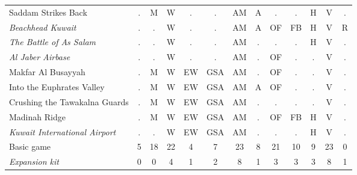 \documentclass[a4paper]{article}
\newenvironment{texte}{\rmfamily\footnotesize}{}
\begin{document}
\begin{texte}
\begin{tabular}{lcccccccccccc}
     Saddam Strikes Back                           & . &  M &  W &  . &  .  & AM & A &  . &  . & H &  V & . \\
\it  Beachhead Kuwait                              & . &  . &  W &  . &  .  & AM & A & OF & FB & H &  V & R \\
\it  The Battle of As Salam                        & . &  . &  W &  . &  .  & AM & . &  . &  . & H &  V & . \\
\it  Al Jaber Airbase                              & . &  . &  W &  . &  .  & AM & . & OF &  . & . &  V & . \\
     Makfar Al Busayyah                            & . &  M &  W & EW & GSA & AM & . & OF &  . & . &  V & . \\
     Into the Euphrates Valley                     & . &  M &  W & EW & GSA & AM & A & OF &  . & . &  V & . \\
     Crushing the Tawakalna Guards                 & . &  M &  W & EW & GSA & AM & . &  . &  . & . &  V & . \\
     Madinah Ridge                                 & . &  M &  W & EW & GSA & AM & . & OF & FB & H &  V & . \\
\it  Kuwait International Airport                  & . &  . &  W & EW & GSA & AM & . &  . &  . & H &  V & . \\
\hline
    Basic game                                     & 5 & 18 & 22 &  4 &  7  & 23 & 8 & 21 & 10 & 9 & 23 & 0 \\
\it Expansion kit                                  & 0 &  0 &  4 &  1 &  2  &  8 & 1 &  3 &  3 & 3 &  8 & 1 \\
\end{tabular}

\end{texte}
\end{document}
